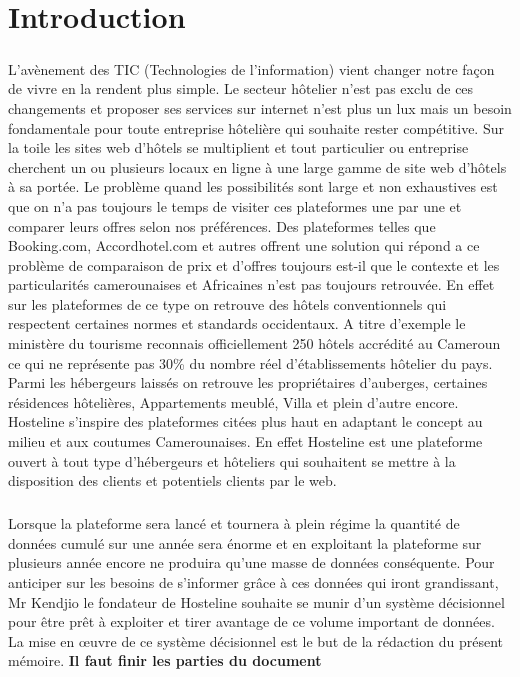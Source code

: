 \chapter*{Introduction}

\paragraph{}
L’avènement des TIC (Technologies de l’information) vient changer notre façon de vivre en la rendent plus simple. Le secteur hôtelier n’est pas exclu de ces changements et proposer ses services sur internet n’est plus un lux mais un besoin fondamentale pour toute entreprise hôtelière qui souhaite rester compétitive. Sur la toile les sites web d’hôtels se multiplient et tout particulier ou entreprise cherchent un ou plusieurs locaux en ligne à une large gamme de site web d’hôtels à sa portée. Le problème quand les possibilités sont large et non exhaustives est que on n’a pas toujours le temps de visiter ces plateformes une par une et comparer leurs offres selon nos préférences. Des plateformes telles que Booking.com, Accordhotel.com et autres offrent une solution qui répond a ce problème de comparaison de prix et d’offres toujours est-il que le contexte et les particularités camerounaises et Africaines n’est pas toujours retrouvée. En effet sur les plateformes de ce type on retrouve des hôtels conventionnels qui respectent certaines normes et standards occidentaux. A titre d’exemple le ministère du tourisme reconnais officiellement 250 hôtels accrédité au Cameroun ce qui ne représente pas 30\% du nombre réel d’établissements hôtelier du pays. Parmi les hébergeurs laissés on retrouve les propriétaires d’auberges, certaines résidences hôtelières, Appartements meublé, Villa et plein d’autre encore. Hosteline s’inspire des plateformes citées plus haut en adaptant le concept au milieu et aux coutumes Camerounaises. En effet Hosteline est une plateforme ouvert à tout type d’hébergeurs et hôteliers qui souhaitent se mettre à la disposition des clients et potentiels clients par le web.
	\paragraph{}
	Lorsque la plateforme sera lancé et tournera à plein régime la quantité de données cumulé sur une année sera énorme et en exploitant la plateforme sur plusieurs année encore ne produira qu’une masse de données conséquente. Pour anticiper sur les besoins de s’informer grâce à ces données  qui iront grandissant, Mr Kendjio le fondateur de Hosteline souhaite se munir d’un système décisionnel pour être prêt à exploiter et tirer avantage de ce volume important de données. La mise en œuvre de ce système décisionnel est le but de la rédaction du présent mémoire. \textbf{Il faut finir les parties du document}

